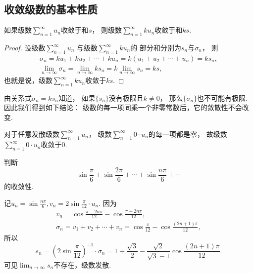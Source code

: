 \subsection{收敛级数的基本性质}
\begin{property}\label{theorem:无穷级数.收敛级数性质1}
如果级数\(\sum_{n=1}^\infty u_n\)收敛于和\(s\)，
则级数\(\sum_{n=1}^\infty k u_n\)收敛于和\(ks\).
\begin{proof}
设级数\(\sum_{n=1}^\infty u_n\)
与级数\(\sum_{n=1}^\infty k u_n\)的
部分和分别为\(s_n\)与\(\sigma_n\)，
则\begin{gather*}
	\sigma_n
	= k u_1 + k u_2 + \dotsb + k u_n
	= k(u_1 + u_2 + \dotsb + u_n) = k s_n, \\
	\lim_{n\to\infty} \sigma_n
	= \lim_{n\to\infty} k s_n
	= k \lim_{n\to\infty} s_n = ks,
\end{gather*}
也就是说，级数\(\sum_{n=1}^\infty k u_n\)收敛于\(ks\).
\end{proof}
\end{property}
\begin{remark}
由关系式\(\sigma_n = k s_n\)知道，
如果\(\{s_n\}\)没有极限且\(k\neq0\)，
那么\(\{\sigma_n\}\)也不可能有极限.
因此我们得到如下结论：
{\color{red}级数的每一项同乘一个非零常数后，它的敛散性不会改变.}
\end{remark}
\begin{remark}
对于任意发散级数\(\sum_{n=1}^\infty u_n\)，
级数\(\sum_{n=1}^\infty 0 \cdot u_n\)的每一项都是零，
故级数\(\sum_{n=1}^\infty 0 \cdot u_n\)收敛于\(0\).
\end{remark}

\begin{example}
判断\begin{equation*}
\sin\frac{\pi}{6}+\sin\frac{2\pi}{6}+\dotsb+\sin\frac{n\pi}{6}+\dotsb
\end{equation*}的收敛性.
\begin{solution}
记\(u_n = \sin\frac{n\pi}{6},
v_n = 2\sin\frac{\pi}{12} \cdot u_n\).
因为\begin{gather*}
	v_n = \cos\frac{\pi-2n\pi}{12} - \cos\frac{\pi+2n\pi}{12}, \\
	\sigma_n
	= v_1 + v_2 + \dotsb + v_n
	= \cos\frac{\pi}{12} - \cos\frac{(2n+1)\pi}{12},
\end{gather*}
所以\begin{equation*}
	s_n
	= \left(2\sin\frac{\pi}{12}\right)^{-1} \cdot \sigma_n
	= 1+\frac{\sqrt{3}}{2} - \frac{\sqrt{2}}{\sqrt{3}-1} \cos\frac{(2n+1)\pi}{12}.
\end{equation*}
可见\(\lim_{n\to\infty} s_n\)不存在，级数发散.
\end{solution}
\end{example}


